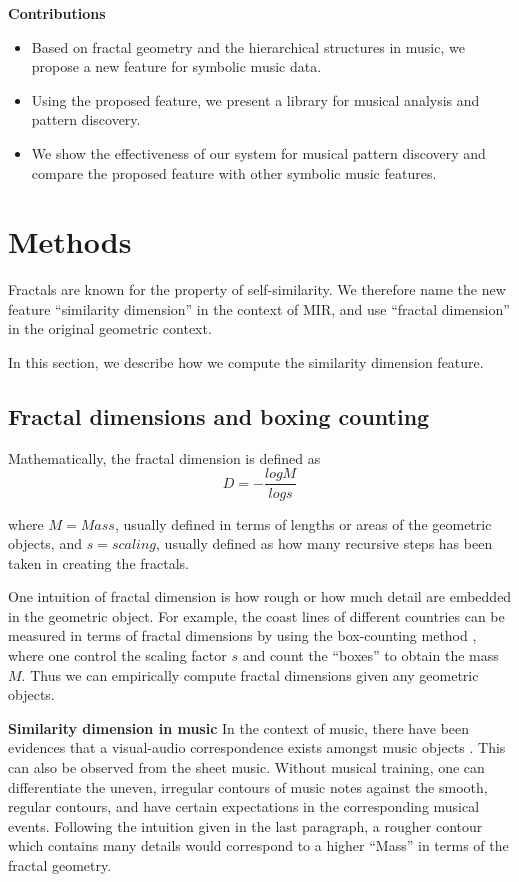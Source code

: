 \documentclass{article}
\begin{document}
\textbf{Contributions}
\begin{itemize}
\item  Based on fractal geometry and the hierarchical structures in music, we propose a new feature for symbolic music data.
\item  Using the proposed feature, we present a library for musical analysis and pattern discovery.
\item  We show the effectiveness of our system for musical pattern discovery and compare the proposed feature with other symbolic music features. 
\end{itemize}

\section{Methods}
Fractals are known for the property of self-similarity.
We therefore name the new feature ``similarity dimension'' in the context of MIR, and use ``fractal dimension'' in the original geometric context.

In this section, we describe how we compute the similarity dimension feature.

\subsection{Fractal dimensions and boxing counting}
Mathematically, the fractal dimension is defined as $$D=-\frac{logM}{logs}$$

where $M=Mass$, usually defined in terms of lengths or areas of the geometric objects, and $s=scaling$, usually defined as how many recursive steps has been taken in creating the fractals.

One intuition of fractal dimension is how rough or how much detail are embedded in the geometric object.
For example, the coast lines of different countries can be measured in terms of fractal dimensions by using the box-counting method \cite{sarkar1994efficient}, where one control the scaling factor $s$ and count the ``boxes'' to obtain the mass $M$.
Thus we can empirically compute fractal dimensions given any geometric objects. 

\textbf{Similarity dimension in music}
In the context of music, there have been evidences that a visual-audio correspondence exists amongst music objects \cite{thorpe2016perception}.
This can also be observed from the sheet music.
Without musical training, one can differentiate the uneven, irregular contours of music notes against the smooth, regular contours, and have certain expectations in the corresponding musical events.
Following the intuition given in the last paragraph, a rougher contour which contains many details would correspond to a higher ``Mass'' in terms of the fractal geometry.
\end{document}
